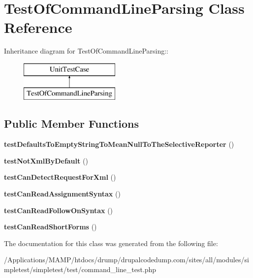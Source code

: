 \hypertarget{class_test_of_command_line_parsing}{
\section{TestOfCommandLineParsing Class Reference}
\label{class_test_of_command_line_parsing}
}
Inheritance diagram for TestOfCommandLineParsing::\begin{figure}[H]
\begin{center}
\leavevmode
\includegraphics[height=2cm]{class_test_of_command_line_parsing}
\end{center}
\end{figure}
\subsection*{Public Member Functions}
\begin{DoxyCompactItemize}
\item 
\hypertarget{class_test_of_command_line_parsing_af2a0bad5df6c0bd2851803a8956bc7c3}{
{\bfseries testDefaultsToEmptyStringToMeanNullToTheSelectiveReporter} ()}
\label{class_test_of_command_line_parsing_af2a0bad5df6c0bd2851803a8956bc7c3}

\item 
\hypertarget{class_test_of_command_line_parsing_a3747a1ddfc94d7c4b75b0a9e92827870}{
{\bfseries testNotXmlByDefault} ()}
\label{class_test_of_command_line_parsing_a3747a1ddfc94d7c4b75b0a9e92827870}

\item 
\hypertarget{class_test_of_command_line_parsing_a00a262840e48572f7e4d299f2eba3a69}{
{\bfseries testCanDetectRequestForXml} ()}
\label{class_test_of_command_line_parsing_a00a262840e48572f7e4d299f2eba3a69}

\item 
\hypertarget{class_test_of_command_line_parsing_a01658c98d443042a5f6929fbdc88662d}{
{\bfseries testCanReadAssignmentSyntax} ()}
\label{class_test_of_command_line_parsing_a01658c98d443042a5f6929fbdc88662d}

\item 
\hypertarget{class_test_of_command_line_parsing_a505d35f7df4e982ff50712b9efa35951}{
{\bfseries testCanReadFollowOnSyntax} ()}
\label{class_test_of_command_line_parsing_a505d35f7df4e982ff50712b9efa35951}

\item 
\hypertarget{class_test_of_command_line_parsing_a6bb9d8da828f353b21a73dddcc1babc9}{
{\bfseries testCanReadShortForms} ()}
\label{class_test_of_command_line_parsing_a6bb9d8da828f353b21a73dddcc1babc9}

\end{DoxyCompactItemize}


The documentation for this class was generated from the following file:\begin{DoxyCompactItemize}
\item 
/Applications/MAMP/htdocs/drump/drupalcodedump.com/sites/all/modules/simpletest/simpletest/test/command\_\-line\_\-test.php\end{DoxyCompactItemize}
